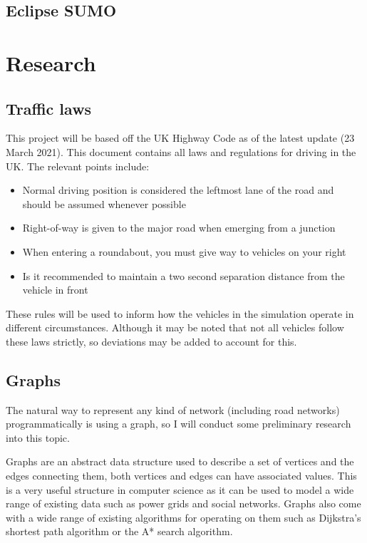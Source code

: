    \subsection{Eclipse SUMO}

\section{Research}

    \subsection{Traffic laws}

        This project will be based off the UK Highway Code \cite{Highway-Code} as of the latest update (23 March 2021). This document contains all laws and regulations for driving in the UK. The relevant points include:

        \begin{itemize}
            \item Normal driving position is considered the leftmost lane of the road and should be assumed whenever possible
            \item Right-of-way is given to the major road when emerging from a junction
            \item When entering a roundabout, you must give way to vehicles on your right
            \item Is it recommended to maintain a two second separation distance from the vehicle in front
        \end{itemize}

        These rules will be used to inform how the vehicles in the simulation operate in different circumstances. Although it may be noted that not all vehicles follow these laws strictly, so deviations may be added to account for this.

    \subsection{Graphs}

        The natural way to represent any kind of network (including road networks) programmatically is using a graph, so I will conduct some preliminary research into this topic.

        Graphs are an abstract data structure used to describe a set of vertices and the edges connecting them, both vertices and edges can have associated values. This is a very useful structure in computer science as it can be used to model a wide range of existing data such as power grids and social networks. Graphs also come with a wide range of existing algorithms for operating on them such as Dijkstra's shortest path algorithm or the A* search algorithm.

